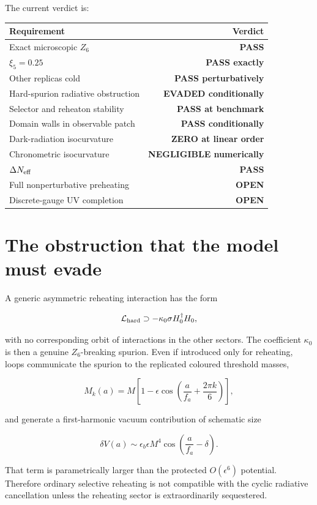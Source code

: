 \documentclass[
  10pt,
]{article}
\begin{document}
The current verdict is:

\begin{longtable}[]{@{}lr@{}}
\toprule\noalign{}
Requirement & Verdict \\
\midrule\noalign{}
\endhead
\bottomrule\noalign{}
\endlastfoot
Exact microscopic \(Z_6\) & \textbf{PASS} \\
\(\xi_5=0.25\) & \textbf{PASS exactly} \\
Other replicas cold & \textbf{PASS perturbatively} \\
Hard-spurion radiative obstruction & \textbf{EVADED conditionally} \\
Selector and reheaton stability & \textbf{PASS at benchmark} \\
Domain walls in observable patch & \textbf{PASS conditionally} \\
Dark-radiation isocurvature & \textbf{ZERO at linear order} \\
Chronometric isocurvature & \textbf{NEGLIGIBLE numerically} \\
\(\Delta N_{\rm eff}\) & \textbf{PASS} \\
Full nonperturbative preheating & \textbf{OPEN} \\
Discrete-gauge UV completion & \textbf{OPEN} \\
\end{longtable}

\section{The obstruction that the model must
evade}\label{the-obstruction-that-the-model-must-evade}

A generic asymmetric reheating interaction has the form

\[
\mathcal L_{\rm hard}
\supset
-\kappa_0\sigma H_0^\dagger H_0,
\]

with no corresponding orbit of interactions in the other sectors. The
coefficient \(\kappa_0\) is then a genuine \(Z_6\)-breaking spurion.
Even if introduced only for reheating, loops communicate the spurion to
the replicated coloured threshold masses,

\[
M_k(a)
=
M\left[1-\epsilon\cos\left(\frac a{f_a}+\frac{2\pi k}{6}\right)\right],
\]

and generate a first-harmonic vacuum contribution of schematic size

\[
\delta V(a)
\sim
\epsilon_b\epsilon M^4
\cos\left(\frac a{f_a}-\delta\right).
\]

That term is parametrically larger than the protected \(O(\epsilon^6)\)
potential. Therefore ordinary selective reheating is not compatible with
the cyclic radiative cancellation unless the reheating sector is
extraordinarily sequestered.
\end{document}
